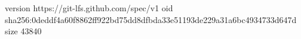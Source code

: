 version https://git-lfs.github.com/spec/v1
oid sha256:0deddf4a60f8862ff922bd75dd8dfbda33e51193de229a31a6bc4934733d647d
size 43840
